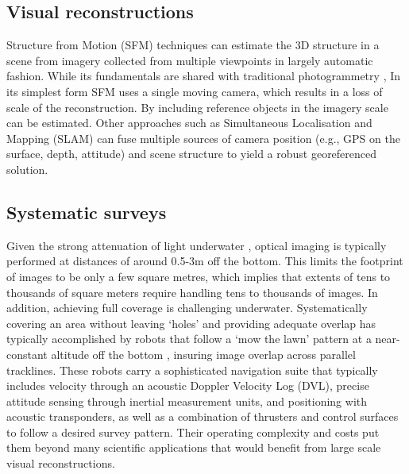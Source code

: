\subsection{Visual reconstructions}
Structure from Motion (SFM) techniques \cite{Hartley_2004} can estimate the 3D structure in a scene from imagery collected from multiple viewpoints in largely automatic fashion. While its fundamentals are shared with traditional photogrammetry \cite{Jones_1982},   In its simplest form SFM uses a single moving camera, which results in a loss of scale of the reconstruction. By including reference objects in the imagery scale can be estimated.
Other approaches such as Simultaneous Localisation and Mapping (SLAM) \cite{Thrun_2008} can fuse multiple sources of camera position (e.g., GPS on the surface, depth, attitude) and scene structure to yield a robust georeferenced solution.

\subsection{Systematic surveys}
Given the strong attenuation of light underwater \cite{DUNTLEY_1963}, optical imaging is typically performed at distances of around 0.5-3m off the bottom. This limits the footprint of images to be only a few square metres, which implies that extents of tens to thousands of square meters require handling tens to thousands of images. In addition, achieving full coverage is challenging underwater. Systematically covering an area without leaving `holes' and providing adequate overlap has typically accomplished by robots that follow a `mow the lawn' pattern at a near-constant altitude off the bottom \cite{Bingham_2010}\cite{Williams_2010}, insuring image overlap across parallel tracklines. These robots carry a sophisticated navigation suite that typically includes velocity through an acoustic Doppler Velocity Log (DVL), precise attitude sensing through inertial measurement units, and positioning with acoustic transponders, as well as a combination of thrusters and control surfaces to follow a desired survey pattern. Their operating complexity and costs put them beyond many scientific applications that would benefit from large scale visual reconstructions. 

